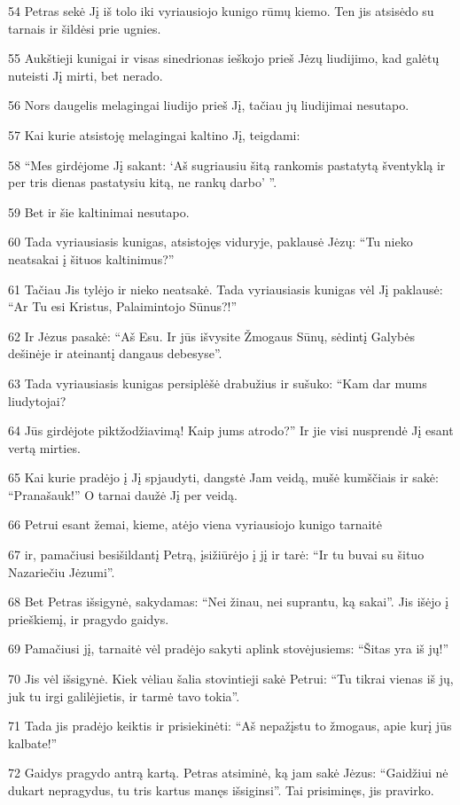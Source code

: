 \par 54 Petras sekė Jį iš tolo iki vyriausiojo kunigo rūmų kiemo. Ten jis atsisėdo su tarnais ir šildėsi prie ugnies. 
\par 55 Aukštieji kunigai ir visas sinedrionas ieškojo prieš Jėzų liudijimo, kad galėtų nuteisti Jį mirti, bet nerado. 
\par 56 Nors daugelis melagingai liudijo prieš Jį, tačiau jų liudijimai nesutapo. 
\par 57 Kai kurie atsistoję melagingai kaltino Jį, teigdami: 
\par 58 “Mes girdėjome Jį sakant: ‘Aš sugriausiu šitą rankomis pastatytą šventyklą ir per tris dienas pastatysiu kitą, ne rankų darbo’ ”. 
\par 59 Bet ir šie kaltinimai nesutapo. 
\par 60 Tada vyriausiasis kunigas, atsistojęs viduryje, paklausė Jėzų: “Tu nieko neatsakai į šituos kaltinimus?” 
\par 61 Tačiau Jis tylėjo ir nieko neatsakė. Tada vyriausiasis kunigas vėl Jį paklausė: “Ar Tu esi Kristus, Palaimintojo Sūnus?!” 
\par 62 Ir Jėzus pasakė: “Aš Esu. Ir jūs išvysite Žmogaus Sūnų, sėdintį Galybės dešinėje ir ateinantį dangaus debesyse”. 
\par 63 Tada vyriausiasis kunigas persiplėšė drabužius ir sušuko: “Kam dar mums liudytojai? 
\par 64 Jūs girdėjote piktžodžiavimą! Kaip jums atrodo?” Ir jie visi nusprendė Jį esant vertą mirties. 
\par 65 Kai kurie pradėjo į Jį spjaudyti, dangstė Jam veidą, mušė kumščiais ir sakė: “Pranašauk!” O tarnai daužė Jį per veidą. 
\par 66 Petrui esant žemai, kieme, atėjo viena vyriausiojo kunigo tarnaitė 
\par 67 ir, pamačiusi besišildantį Petrą, įsižiūrėjo į jį ir tarė: “Ir tu buvai su šituo Nazariečiu Jėzumi”. 
\par 68 Bet Petras išsigynė, sakydamas: “Nei žinau, nei suprantu, ką sakai”. Jis išėjo į prieškiemį, ir pragydo gaidys. 
\par 69 Pamačiusi jį, tarnaitė vėl pradėjo sakyti aplink stovėjusiems: “Šitas yra iš jų!” 
\par 70 Jis vėl išsigynė. Kiek vėliau šalia stovintieji sakė Petrui: “Tu tikrai vienas iš jų, juk tu irgi galilėjietis, ir tarmė tavo tokia”. 
\par 71 Tada jis pradėjo keiktis ir prisiekinėti: “Aš nepažįstu to žmogaus, apie kurį jūs kalbate!” 
\par 72 Gaidys pragydo antrą kartą. Petras atsiminė, ką jam sakė Jėzus: “Gaidžiui nė dukart nepragydus, tu tris kartus manęs išsiginsi”. Tai prisiminęs, jis pravirko.



